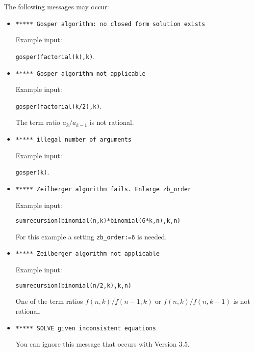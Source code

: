 The following messages may occur:
\begin{itemize}
\item
\texttt{***** Gosper algorithm:\ no closed form solution exists}

Example input:

\texttt{gosper(factorial(k),k)}.
\item
\texttt{***** Gosper algorithm not applicable}

Example input:

\texttt{gosper(factorial(k/2),k)}.

The term ratio $a_k/a_{k-1}$ is not rational.
\item
\texttt{***** illegal number of arguments}

Example input:

\texttt{gosper(k)}.
\item
\texttt{***** Zeilberger algorithm fails.\ Enlarge zb\_order}

Example input:

\texttt{sumrecursion(binomial(n,k)*binomial(6*k,n),k,n)}

For  this example a setting \texttt{zb\_order:=6} is needed.
\item
\texttt{***** Zeilberger algorithm not applicable}

Example input:

\texttt{sumrecursion(binomial(n/2,k),k,n)}

One of the term ratios $f(n,k)/f(n-1,k)$ or $f(n,k)/f(n,k-1)$
is not rational.
\item
\texttt{***** SOLVE given inconsistent equations}

You can ignore this message that occurs with Version 3.5.
\end{itemize}
